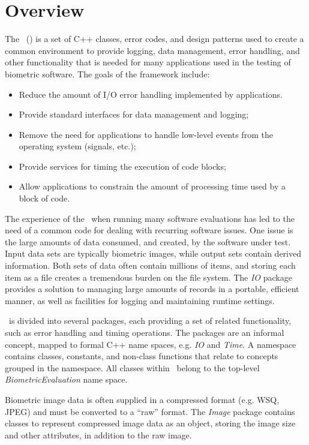 \chapter{Overview}

The \lname\ (\sname)
is a set of C++\cite{cpp:plguide} classes, error codes, and design
patterns used to create a common environment to provide logging, data
management, error handling, and other functionality that is needed for many
applications used in the testing of biometric software. The goals of the
framework include:
\begin{itemize}
\item Reduce the amount of I/O error handling implemented by applications.
\item Provide standard interfaces for data management and logging;
\item Remove the need for applications to handle low-level events from the
operating system (signals, etc.);
\item Provide services for timing the execution of code blocks;
\item Allow applications to constrain the amount of processing time used
by a block of code.
\end{itemize}

The experience of the \nistig\ when running many software evaluations has led
to the need of a common code for dealing with recurring software issues. One
issue is the large amounts of data consumed, and created, by the software
under test. Input data sets are typically biometric images, while output sets
contain derived information. Both sets of data often contain millions of
items, and storing each item as a file creates a tremendous burden on the file
system. The {\em IO} package provides a solution to
managing large amounts of records in a portable, efficient manner, as well as 
facilities for logging and maintaining runtime settings.

\sname\ is divided into several packages, each providing a set of
related functionality, such as error handling and timing operations. The
packages are an informal concept, mapped to formal C++ name spaces, e.g.
{\em IO} and {\em Time}. A namespace contains classes, constants, and 
non-class functions that relate to concepts grouped in the namespace.
All classes within \sname\ belong to the top-level {\em BiometricEvaluation}
name space.

Biometric image data is often supplied in a compressed format (e.g. WSQ, JPEG)
and must be converted to a ``raw'' format. The {\em Image} package contains
classes to represent compressed image data as an object, storing the image
size and other attributes, in addition to the raw image.

